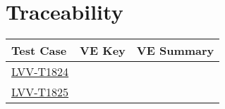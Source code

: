 \section{Traceability}

\begin{longtable}{p{3cm}p{3cm}L{9cm}}
\hline
\textbf{Test Case} & \textbf{VE Key} & \textbf{VE Summary} \\ \hline
\href{https://jira.lsstcorp.org/secure/Tests.jspa#/testCase/LVV-T1824}{LVV-T1824} &
 & \\ \hline
\href{https://jira.lsstcorp.org/secure/Tests.jspa#/testCase/LVV-T1825}{LVV-T1825} &
 & \\ \hline
\end{longtable}
